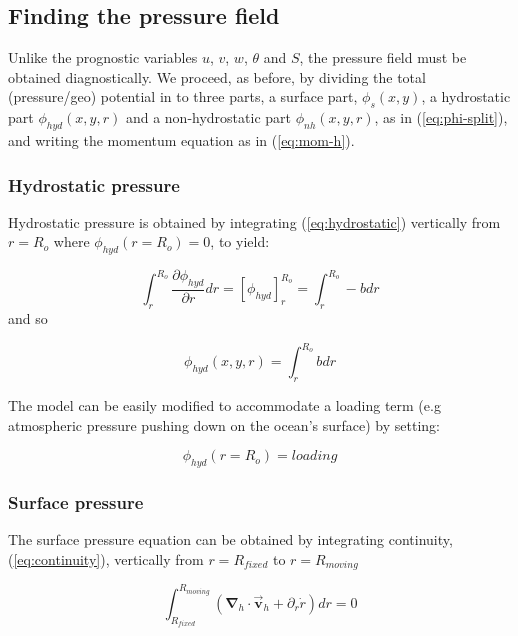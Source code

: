 \subsection{Finding the pressure field}
\label{sec:finding_the_pressure_field}

Unlike the prognostic variables $u$, $v$, $w$, $\theta $ and $S$, the
pressure field must be obtained diagnostically. We proceed, as before, by
dividing the total (pressure/geo) potential in to three parts, a surface
part, $\phi _{s}(x,y)$, a hydrostatic part $\phi _{hyd}(x,y,r)$ and a
non-hydrostatic part $\phi _{nh}(x,y,r)$, as in (\ref{eq:phi-split}), and
writing the momentum equation as in (\ref{eq:mom-h}).

\subsubsection{Hydrostatic pressure}

Hydrostatic pressure is obtained by integrating (\ref{eq:hydrostatic})
vertically from $r=R_{o}$ where $\phi _{hyd}(r=R_{o})=0$, to yield:

\begin{equation*}
\int_{r}^{R_{o}}\frac{\partial \phi _{hyd}}{\partial r}dr=\left[ \phi _{hyd}
\right] _{r}^{R_{o}}=\int_{r}^{R_{o}}-bdr
\end{equation*}
and so

\begin{equation}
\phi _{hyd}(x,y,r)=\int_{r}^{R_{o}}bdr  \label{eq:hydro-phi}
\end{equation}

The model can be easily modified to accommodate a loading term (e.g
atmospheric pressure pushing down on the ocean's surface) by setting:

\begin{equation}
\phi _{hyd}(r=R_{o})=loading  \label{eq:loading}
\end{equation}

\subsubsection{Surface pressure}

The surface pressure equation can be obtained by integrating continuity,
(\ref{eq:continuity}), vertically from $r=R_{fixed}$ to $r=R_{moving}$

\begin{equation*}
\int_{R_{fixed}}^{R_{moving}}\left( \mathbf{\nabla }_{h}\cdot \vec{\mathbf{v}
}_{h}+\partial _{r}\dot{r}\right) dr=0
\end{equation*}

